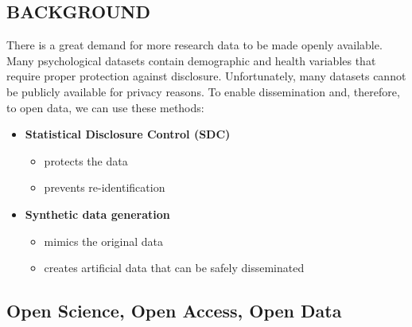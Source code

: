 \documentclass[a0,portrait]{a0poster}
\begin{document}
\begin{multicols}{3} %

\Large
\section{BACKGROUND}

There is a great demand for more research data to be made openly available.
Many psychological datasets contain demographic and health variables that require proper protection against disclosure.
Unfortunately, many datasets cannot be publicly available for privacy reasons.
\bigbreak
To enable dissemination and, therefore, to open data, we can use these methods:
\begin{itemize}
     \item[\ding{228}] \textbf{Statistical Disclosure Control (SDC)}
        \begin{itemize}
            \item protects the data
            \item prevents re-identification
        \end{itemize}        
     \item[\ding{228}] \textbf{Synthetic data generation}
        \begin{itemize}
            \item mimics the original data
            \item creates artificial data that can be safely disseminated
        \end{itemize}        
\end{itemize}

\subsection{Open Science, Open Access, Open Data}


\end{multicols}
\end{document}
